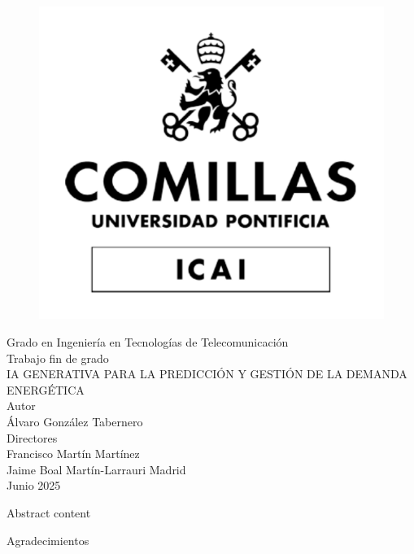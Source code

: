 \documentclass[12pt, a4paper]{book} %
\newenvironment{abstract}%
{\cleardoublepage \null \vfill \begin{center}%
		\bfseries \abstractname \end{center}}%
{\vfill\null}
\begin{document}
	
	\frontmatter %
	\pagestyle{empty} %
	
	\begin{titlepage}
		\begin{figure}
			\centering
			\includegraphics[width=0.3\linewidth]{LogoUniversidadBN}
		\end{figure}
		\centering
		\Large Grado en Ingeniería en Tecnologías de Telecomunicación \\ %
		\vspace*{2.5em} %
		\centering
		Trabajo fin de grado \\ %
		\vspace*{1em}
		IA GENERATIVA PARA LA PREDICCIÓN Y GESTIÓN DE LA DEMANDA ENERGÉTICA %
		\\ \large
		\vspace*{3em}
		Autor \\ Álvaro González Tabernero \\ %
		\vspace*{1em}
		Directores \\ Francisco Martín Martínez \\ Jaime Boal Martín-Larrauri %
		\vfill
		Madrid \\
		Junio 2025 %
	\end{titlepage}
	\begin{abstract}
		Abstract content
	\end{abstract}

	\newpage

	{\centering Agradecimientos\\}
	\vfill %
\end{document}
